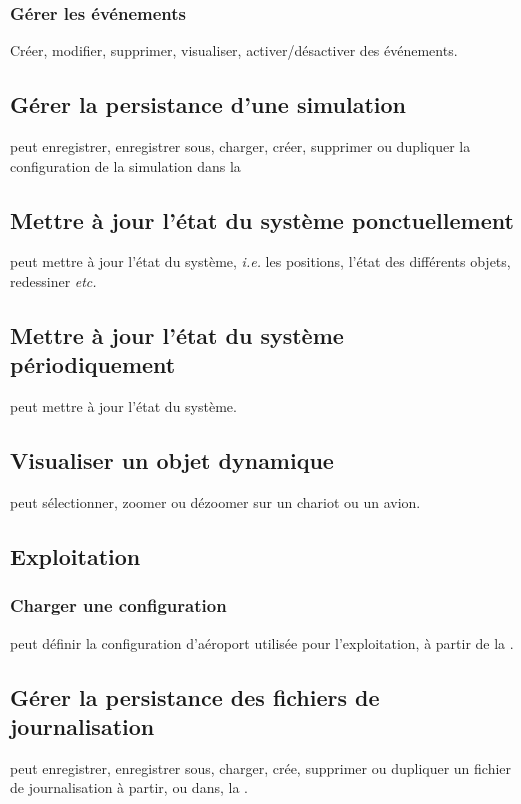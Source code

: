 \subsubsection{Gérer les événements}
Créer, modifier, supprimer, visualiser, activer/désactiver des événements.

\subsection{Gérer la persistance d'une simulation}
 peut enregistrer, enregistrer sous, charger, créer, supprimer ou dupliquer la configuration de la simulation dans la 

\subsection{Mettre à jour l'état du système ponctuellement}
 peut mettre à jour l'état du système, \textsl{i.e.} les positions, l'état des différents objets, redessiner \textsl{etc.}

\subsection{Mettre à jour l'état du système périodiquement}
 peut mettre à jour l'état du système.

\subsection{Visualiser un objet dynamique}
 peut sélectionner, zoomer ou dézoomer sur un chariot ou un avion.
\subsection{Exploitation}
\subsubsection{Charger une configuration}
 peut définir la configuration d'aéroport utilisée pour l'exploitation, à partir de la .

\subsection{Gérer la persistance des fichiers de journalisation}
 peut enregistrer, enregistrer sous, charger, crée, supprimer ou dupliquer un fichier de journalisation à partir, ou dans, la .

